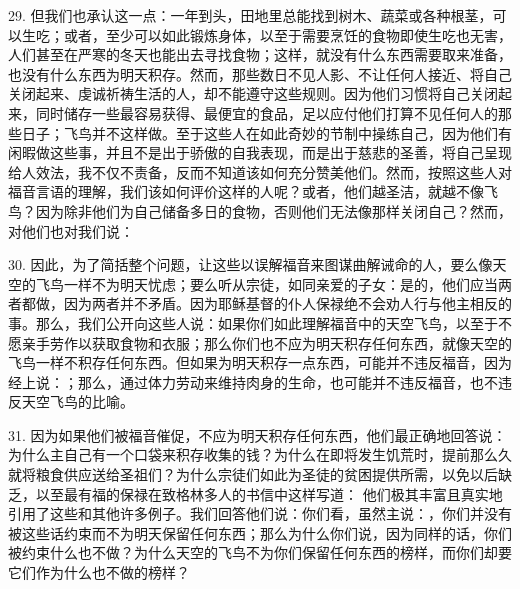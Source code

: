 29. 但我们也承认这一点：一年到头，田地里总能找到树木、蔬菜或各种根茎，可以生吃；或者，至少可以如此锻炼身体，以至于需要烹饪的食物即使生吃也无害，人们甚至在严寒的冬天也能出去寻找食物；这样，就没有什么东西需要取来准备，也没有什么东西为明天积存。然而，那些数日不见人影、不让任何人接近、将自己关闭起来、虔诚祈祷生活的人，却不能遵守这些规则。因为他们习惯将自己关闭起来，同时储存一些最容易获得、最便宜的食品，足以应付他们打算不见任何人的那些日子；飞鸟并不这样做。至于这些人在如此奇妙的节制中操练自己，因为他们有闲暇做这些事，并且不是出于骄傲的自我表现，而是出于慈悲的圣善，将自己呈现给人效法，我不仅不责备，反而不知道该如何充分赞美他们。然而，按照这些人对福音言语的理解，我们该如何评价这样的人呢？或者，他们越圣洁，就越不像飞鸟？因为除非他们为自己储备多日的食物，否则他们无法像那样关闭自己？然而，对他们也对我们说：\par

30. 因此，为了简括整个问题，让这些以误解福音来图谋曲解诫命的人，要么像天空的飞鸟一样不为明天忧虑；要么听从宗徒，如同亲爱的子女：是的，他们应当两者都做，因为两者并不矛盾。因为耶稣基督的仆人保禄绝不会劝人行与他主相反的事。那么，我们公开向这些人说：如果你们如此理解福音中的天空飞鸟，以至于不愿亲手劳作以获取食物和衣服；那么你们也不应为明天积存任何东西，就像天空的飞鸟一样不积存任何东西。但如果为明天积存一点东西，可能并不违反福音，因为经上说：；那么，通过体力劳动来维持肉身的生命，也可能并不违反福音，也不违反天空飞鸟的比喻。\par

31. 因为如果他们被福音催促，不应为明天积存任何东西，他们最正确地回答说：为什么主自己有一个口袋来积存收集的钱？为什么在即将发生饥荒时，提前那么久就将粮食供应送给圣祖们？为什么宗徒们如此为圣徒的贫困提供所需，以免以后缺乏，以至最有福的保禄在致格林多人的书信中这样写道： 他们极其丰富且真实地引用了这些和其他许多例子。我们回答他们说：你们看，虽然主说：，你们并没有被这些话约束而不为明天保留任何东西；那么为什么你们说，因为同样的话，你们被约束什么也不做？为什么天空的飞鸟不为你们保留任何东西的榜样，而你们却要它们作为什么也不做的榜样？\par

